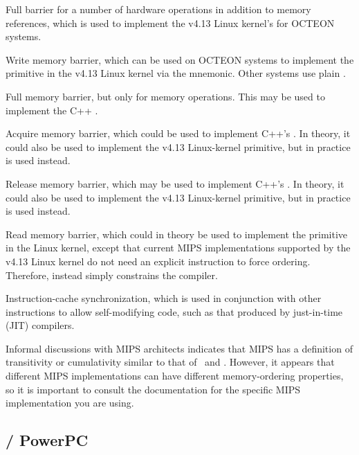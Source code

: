 \begin{description}[style=nextline]
\item[\tco{SYNC}]
	Full barrier for a number of hardware operations in addition
	to memory references, which is used to implement the v4.13
	Linux kernel's  for OCTEON systems.
\item[\tco{SYNC_WMB}]
	Write memory barrier, which can be used on OCTEON systems
	to implement the
	 primitive in the v4.13 Linux kernel via the
	 mnemonic.
	Other systems use plain .
\item[\tco{SYNC_MB}]
	Full memory barrier, but only for memory operations.
	This may be used to implement the
	C++ .
\item[\tco{SYNC_ACQUIRE}]
	Acquire memory barrier, which could be used to implement
	C++'s .
	In theory, it could also be used to implement the v4.13 Linux-kernel
	 primitive, but in practice
	 is used instead.
\item[\tco{SYNC_RELEASE}]
	Release memory barrier, which may be used to implement
	C++'s .
	In theory, it could also be used to implement the v4.13 Linux-kernel
	 primitive, but in practice
	 is used instead.
\item[\tco{SYNC_RMB}]
	Read memory barrier, which could in theory be used to implement the
	 primitive in the Linux kernel, except that current
	MIPS implementations supported by the v4.13 Linux kernel do not
	need an explicit instruction to force ordering.
	Therefore,  instead simply constrains the compiler.
\item[\tco{SYNCI}]
	Instruction-cache synchronization, which is used in conjunction with
	other instructions to allow self-modifying code, such as that produced
	by just-in-time (JIT) compilers.
\end{description}

Informal discussions with MIPS architects indicates that MIPS has a
definition of transitivity or cumulativity similar to that of
\ARM\ and \Power{}\@.
However, it appears that different MIPS implementations can have
different memory-ordering properties, so it is important to consult
the documentation for the specific MIPS implementation you are using.

\subsection{\Power{} / PowerPC}
\label{sec:memorder:POWER / PowerPC}

